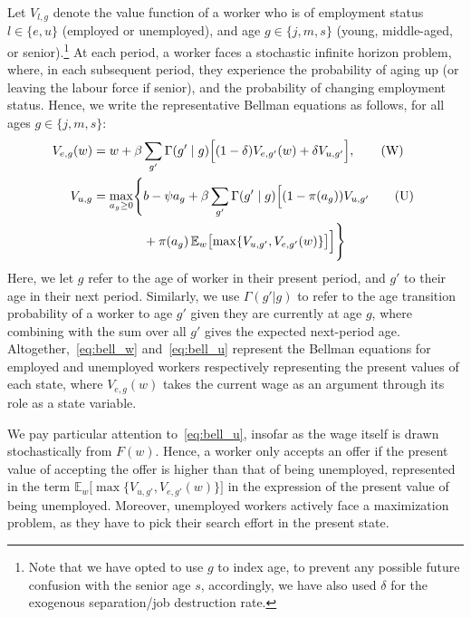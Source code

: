 \documentclass{article}
\begin{document}
Let $V_{l,g}$ denote the value function of a worker who is of employment status $l\in\{e,u\}$ (employed or unemployed), and age $g\in\{j,m,s\}$ (young, middle-aged, or senior).\footnote{Note that we have opted to use $g$ to index age, to prevent any possible future confusion with the senior age $s$, accordingly, we have also used $\delta$ for the exogenous separation/job destruction rate.} At each period, a worker faces a stochastic infinite horizon problem, where, in each subsequent period, they experience the probability of aging up (or leaving the labour force if senior), and the probability of changing employment status. Hence, we write the representative Bellman equations as follows, for all ages $g\in\{j,m,s\}$:
\begin{align}
V_{e,g}(w)
&=
w+\beta\sum_{g'}\Gamma(g'\mid g)
\Bigl[
(1-\delta)V_{e,g'}(w)+\delta V_{u,g'}
\Bigr],
\tag{W}\label{eq:bell_w}
\\
V_{u,g}
&= \max_{a_g \ge 0} \Biggl\{
b - \psi a_g + \beta \sum_{g'} \Gamma(g' \mid g)
\Bigl[
(1 - \pi(a_g)) V_{u,g'} \tag{U}~\label{eq:bell_u}\\
&\qquad\qquad + \pi(a_g)\, \mathbb{E}_w \bigl[\max\{V_{u,g'}, V_{e,g'}(w)\}\bigr]
\Bigr]
\Biggr\} \notag
\end{align}
Here, we let $g$ refer to the age of worker in their present period, and $g'$ to their age in their next period. Similarly, we use $\Gamma(g'|g)$ to refer to the age transition probability of a worker to age $g'$ given they are currently at age $g$, where combining with the sum over all $g'$ gives the expected next-period age. Altogether,~\eqref{eq:bell_w} and~\eqref{eq:bell_u} represent the Bellman equations for employed and unemployed workers respectively representing the present values of each state, where $V_{e,g}(w)$ takes the current wage as an argument through its role as a state variable.

We pay particular attention to~\eqref{eq:bell_u}, insofar as the wage itself is drawn stochastically from $F(w)$. Hence, a worker only accepts an offer if the present value of accepting the offer is higher than that of being unemployed, represented in the term ${\mathbb{E}}_w \bigl[\max\{V_{u,g'}, V_{e,g'}(w)\}\bigr]$ in the expression of the present value of being unemployed. Moreover, unemployed workers actively face a maximization problem, as they have to pick their search effort in the present state.
\end{document}
